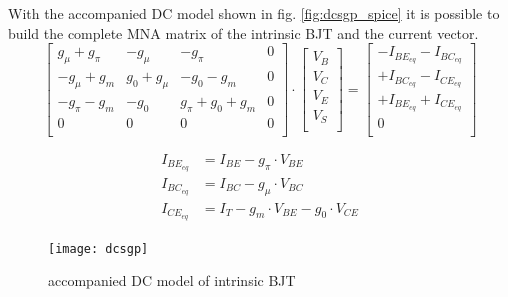 \documentclass[10pt]{report}
\begin{document}
With the accompanied DC model shown in fig. \ref{fig:dcsgp_spice} it
is possible to build the complete MNA matrix of the intrinsic BJT and
the current vector.
\begin{equation}
\begin{bmatrix}
g_{\mu} + g_{\pi} & -g_{\mu} & -g_{\pi} & 0\\
-g_{\mu} + g_{m} & g_{0} + g_{\mu} & -g_{0} - g_{m} & 0\\
-g_{\pi} - g_{m} & -g_{0} & g_{\pi} + g_{0} + g_{m} & 0\\
0 & 0 & 0 & 0\\
\end{bmatrix}
\cdot
\begin{bmatrix}
V_{B}\\
V_{C}\\
V_{E}\\
V_{S}\\
\end{bmatrix}
=
\begin{bmatrix}
-I_{BE_{eq}} - I_{BC_{eq}}\\
+I_{BC_{eq}} - I_{CE_{eq}}\\
+I_{BE_{eq}} + I_{CE_{eq}}\\
0\\
\end{bmatrix}
\end{equation}

\begin{align}
I_{BE_{eq}} &= I_{BE} - g_{\pi} \cdot V_{BE}\\
I_{BC_{eq}} &= I_{BC} - g_{\mu} \cdot V_{BC}\\
I_{CE_{eq}} &= I_{T} - g_{m} \cdot V_{BE} - g_{0} \cdot V_{CE}
\end{align}

\begin{figure}[ht]
\begin{center}
\texttt{[image: dcsgp]}
\end{center}
\caption{accompanied DC model of intrinsic BJT}
\label{fig:dcsgp}
\end{figure}
\FloatBarrier
\end{document}
